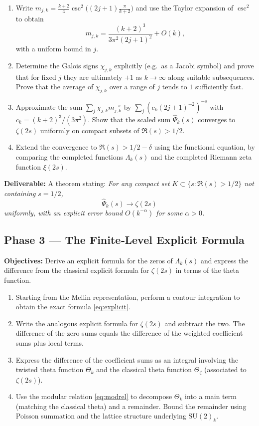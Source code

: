 \documentclass[11pt,a4paper]{article}
\theoremstyle{remark}
\begin{document}
\begin{enumerate}
\item Write \(m_{j,k} = \frac{k+2}{4}\csc^2\bigl((2j+1)\frac{\pi}{k+2}\bigr)\) and use the Taylor expansion of \(\csc^2\) to obtain
  \[
  m_{j,k} = \frac{(k+2)^3}{3\pi^2(2j+1)^2} + O(k),
  \]
  with a uniform bound in \(j\).
\item Determine the Galois signs \(\chi_{j,k}\) explicitly (e.g.\ as a Jacobi symbol) and prove that for fixed \(j\) they are ultimately \(+1\) as \(k\to\infty\) along suitable subsequences.
  Prove that the average of \(\chi_{j,k}\) over a range of \(j\) tends to \(1\) sufficiently fast.
\item Approximate the sum \(\sum_j \chi_{j,k} m_{j,k}^{-s}\) by \(\sum_j (c_k(2j+1)^{-2})^{-s}\) with \(c_k = (k+2)^3/(3\pi^2)\).
  Show that the scaled sum \(\widehat{\Psi}_k(s)\) converges to \(\zeta(2s)\) uniformly on compact subsets of \(\Re(s)>1/2\).
\item Extend the convergence to \(\Re(s)>1/2-\delta\) using the functional equation, by comparing the completed functions \(\Lambda_k(s)\) and the completed Riemann zeta function \(\xi(2s)\).
\end{enumerate}

\textbf{Deliverable:} A theorem stating:
\textit{For any compact set \(K\subset\{s:\Re(s)>1/2\}\) not containing \(s=1/2\),
\[
\widehat{\Psi}_k(s) \longrightarrow \zeta(2s)
\]
uniformly, with an explicit error bound \(O(k^{-\alpha})\) for some \(\alpha>0\).}

\subsection{Phase 3 --- The Finite‑Level Explicit Formula}

\textbf{Objectives:} Derive an explicit formula for the zeros of \(\Lambda_k(s)\) and express the difference from the classical explicit formula for \(\zeta(2s)\) in terms of the theta function.

\begin{enumerate}
\item Starting from the Mellin representation, perform a contour integration to obtain the exact formula \eqref{eq:explicit}.
\item Write the analogous explicit formula for \(\zeta(2s)\) and subtract the two.
  The difference of the zero sums equals the difference of the weighted coefficient sums plus local terms.
\item Express the difference of the coefficient sums as an integral involving the twisted theta function \(\Theta_k\) and the classical theta function \(\Theta_\zeta\) (associated to \(\zeta(2s)\)).
\item Use the modular relation \eqref{eq:modrel} to decompose \(\Theta_k\) into a main term (matching the classical theta) and a remainder.
  Bound the remainder using Poisson summation and the lattice structure underlying \(\mathrm{SU}(2)_k\).
\end{enumerate}
\end{document}
